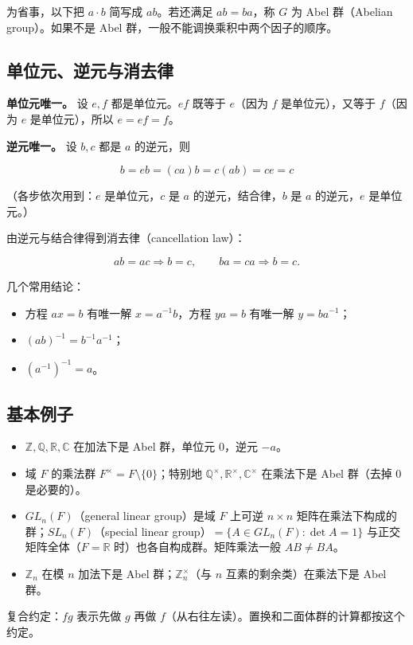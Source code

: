 为省事，以下把 $a\cdot b$ 简写成 $ab$。若还满足 $ab=ba$，称 $G$ 为 Abel 群（Abelian group）。如果不是 Abel 群，一般不能调换乘积中两个因子的顺序。

\subsection{单位元、逆元与消去律}


\textbf{单位元唯一。} 设 $e,f$ 都是单位元。$ef$ 既等于 $e$（因为 $f$ 是单位元），又等于 $f$（因为 $e$ 是单位元），所以 $e=ef=f$。

\textbf{逆元唯一。} 设 $b,c$ 都是 $a$ 的逆元，则

\[b=eb=(ca)b=c(ab)=ce=c\]

（各步依次用到：$e$ 是单位元，$c$ 是 $a$ 的逆元，结合律，$b$ 是 $a$ 的逆元，$e$ 是单位元。）

由逆元与结合律得到消去律（cancellation law）：

\[ab=ac\Rightarrow b=c,\qquad ba=ca\Rightarrow b=c.\]

几个常用结论：

\begin{itemize}
\item 方程 $ax=b$ 有唯一解 $x=a^{-1}b$，方程 $ya=b$ 有唯一解 $y=ba^{-1}$；
\item $(ab)^{-1}=b^{-1}a^{-1}$；
\item $(a^{-1})^{-1}=a$。
\end{itemize}


\subsection{基本例子}


\begin{itemize}
\item $\mathbb Z,\mathbb Q,\mathbb R,\mathbb C$ 在加法下是 Abel 群，单位元 $0$，逆元 $-a$。
\item 域 $F$ 的乘法群 $F^\times=F\setminus\{0\}$；特别地 $\mathbb Q^\times,\mathbb R^\times,\mathbb C^\times$ 在乘法下是 Abel 群（去掉 $0$ 是必要的）。
\item $GL_n(F)$（general linear group）是域 $F$ 上可逆 $n\times n$ 矩阵在乘法下构成的群；$SL_n(F)$（special linear group）$=\{A\in GL_n(F):\det A=1\}$ 与正交矩阵全体（$F=\mathbb R$ 时）也各自构成群。矩阵乘法一般 $AB\ne BA$。
\item $\mathbb Z_n$ 在模 $n$ 加法下是 Abel 群；$\mathbb Z_n^\times$（与 $n$ 互素的剩余类）在乘法下是 Abel 群。
\end{itemize}


复合约定：$fg$ 表示先做 $g$ 再做 $f$（从右往左读）。置换和二面体群的计算都按这个约定。
